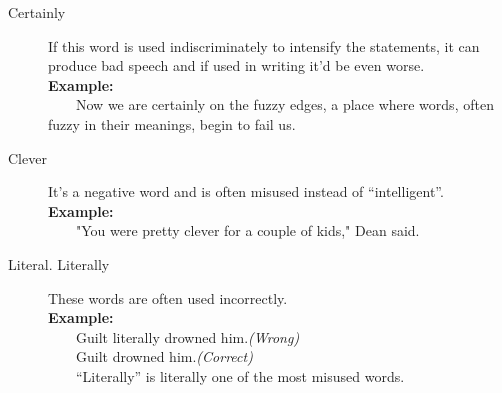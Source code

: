 \documentclass{report}
\newcommand{\xmpl}{\textbf{Example:}\\} %
\newcommand{\indnt}{\ \ \ \ } %
\begin{document}
\begin{description}
	\item[Certainly] If this word is used indiscriminately to intensify the statements, it can produce bad speech and if used in writing it'd be even worse.\\
	\xmpl
	\indnt Now we are certainly on the fuzzy edges, a place where words, often fuzzy in their meanings, begin to fail us.
	\item[Clever] It's a negative word and is often misused instead of ``intelligent''.\\
	\xmpl
	\indnt "You were pretty clever for a couple of kids," Dean said.
	\item[Literal. Literally] These words are often used incorrectly.\\
	\xmpl
	\indnt Guilt literally drowned him.\textit{(Wrong)}\\
	\indnt Guilt drowned him.\textit{(Correct)}\\
	\indnt ``Literally'' is literally one of the most misused words.
\end{description}
\end{document}
